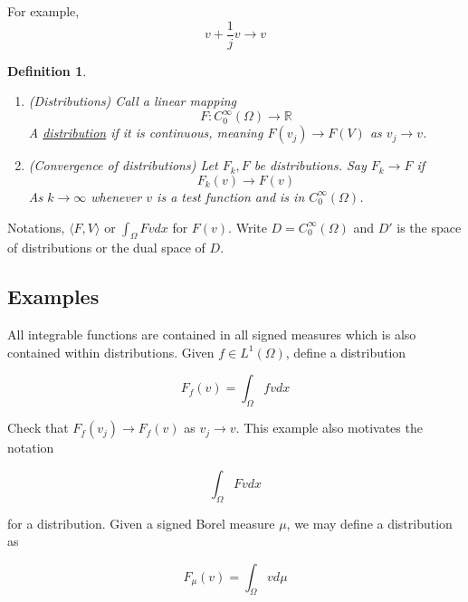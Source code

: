 \documentclass{article}
\newtheorem{definition}[theorem]{Definition}
\newtheorem{one minute paper}[theorem]{One Minute Paper}
\begin{document}
For example, $$v + \frac{1}{j}v \rightarrow v$$

\begin{definition}
    \begin{enumerate}
        \item (Distributions) Call a linear mapping 
        \begin{equation}
            F: C_{0}^{\infty}(\Omega) \rightarrow \mathbb{R}
        \end{equation}
        A \underline{distribution} if it is continuous, meaning $F(v_j) \rightarrow F(V)$ as $v_j \rightarrow v$. 
        \item (Convergence of distributions) Let $F_k, F$ be distributions. Say $F_k \rightarrow F$ if 
        \begin{equation}
            F_k(v) \rightarrow F(v)    
        \end{equation}
        As $k \rightarrow \infty$ whenever $v$ is a test function and is in $C_{0}^{\infty}(\Omega)$. 
    \end{enumerate}
\end{definition}

Notations, $\langle F, V \rangle$ or $\int_{\Omega}Fvdx$ for $F(v)$. Write $D = C_{0}^{\infty}(\Omega)$ and $D'$ is the space of distributions or the dual space of $D$. 

\subsection*{Examples}

All integrable functions are contained in all signed measures which is also contained within distributions. Given $f \in L^1(\Omega)$, define a distribution 

\begin{equation}
    F_f(v) = \int_{\Omega}fv dx
\end{equation}

Check that $F_f(v_j) \rightarrow F_f(v)$ as $v_j \rightarrow v$. This example also motivates the notation 

\begin{equation}
    \int_{\Omega}Fv dx
\end{equation}

for a distribution. Given a signed Borel measure $\mu$, we may define a distribution as 

\begin{equation}
    F_{\mu}(v) = \int_{\Omega}vd\mu
\end{equation}
\end{document}
